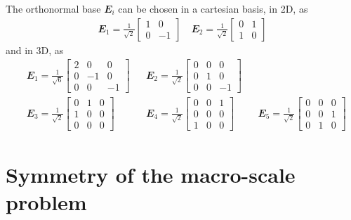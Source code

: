\documentclass[12pt,review]{elsarticle}
\renewcommand{\ts}[1]{\mathbfit{#1}}
\begin{document}
The orthonormal base $\ts E_i$ can be chosen in a cartesian basis, in 2D, as
\begin{align}
 \ts E_1 = \frac{1}{\sqrt{2}}\begin{bmatrix} 1 & 0\\ 0 & -1\end{bmatrix}\quad \ts E_2 = \frac{1}{\sqrt{2}}\begin{bmatrix} 0 & 1\\ 1 & 0\end{bmatrix}
\end{align}
and in 3D, as
\begin{align}
 &\ts E_1 = \frac{1}{\sqrt{6}}\begin{bmatrix} 2 & 0 & 0\\ 0 & -1 & 0\\ 0 & 0 & -1\end{bmatrix}
 &&\ts E_2 = \frac{1}{\sqrt{2}}\begin{bmatrix} 0 & 0 & 0\\ 0 & 1 & 0 \\ 0 & 0 & -1\end{bmatrix}
 &&\\
 &\ts E_3 = \frac{1}{\sqrt{2}}\begin{bmatrix} 0 & 1 & 0\\ 1 & 0 & 0 \\ 0 & 0 & 0\end{bmatrix}
 &&\ts E_4 = \frac{1}{\sqrt{2}}\begin{bmatrix} 0 & 0 & 1\\ 0 & 0 & 0 \\ 1 & 0 & 0\end{bmatrix}
 &&\ts E_5 = \frac{1}{\sqrt{2}}\begin{bmatrix} 0 & 0 & 0\\ 0 & 0 & 1 \\ 0 & 1 & 0\end{bmatrix}
\end{align}


\section{Symmetry of the macro-scale problem}
\end{document}
